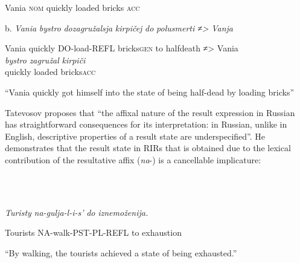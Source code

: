 \documentclass[output=paper,modfonts, nonflat]{langsci/langscibook}
\begin{document}
\begin{styleinnerExample}
    Vania \textsc{nom} quickly loaded     bricks \textsc{acc}
\end{styleinnerExample}

\begin{styleinnerExample}
  b.  \textit{Vania} \textit{bystro}     \textit{dozagružalsja}   \textit{kirpičej}       \textit{do}  \textit{polusmerti} \textit{≠>} \textit{Vanja} 
\end{styleinnerExample}

\begin{styleinnerExample}
    Vania quickly DO-load-REFL   bricks\textsc{gen}  to  halfdeath  ≠> Vania \\
\textit{bystro}   \textit{zagružal}   \textit{kirpiči\\
}quickly loaded   bricks\textsc{acc}
\end{styleinnerExample}

\begin{styleinnerExample}
    “Vania quickly got himself into the state of being half-dead by loading bricks”
\end{styleinnerExample}

Tatevosov proposes that “the affixal nature of the result expression in Russian has straightforward consequences for its interpretation: in Russian, unlike in English, descriptive properties of a result state are underspecified”. He demonstrates that the result state in RIRs that is obtained due to the lexical contribution of the resultative affix (\textit{na}{}-) is a cancellable implicature: \\

\begin{styleinnerExample}
\ea%
    \label{ex:key:42}
    \gll\\
        \\
    \glt
    \z

          \textit{Turisty} \textit{na-gulja-l-i-s’}                     \textit{do} \textit{iznemoženija.} \citep{Tatevosov2010}
\end{styleinnerExample}

\begin{styleinnerExample}
  Tourists   NA-walk-PST-PL-REFL to exhaustion
\end{styleinnerExample}

\begin{styleinnerExample}
  “By walking, the tourists achieved a state of being exhausted.” 
\end{styleinnerExample}
\end{document}
